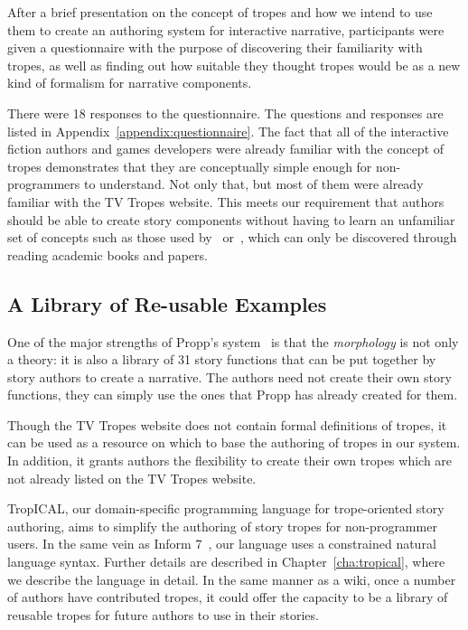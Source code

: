 \documentclass[11pt]{report}
\begin{document}
After a brief presentation on the concept of tropes and how we intend to use
them to create an authoring system for interactive narrative, participants were
given a questionnaire with the purpose of discovering their familiarity with
tropes, as well as finding out how suitable they thought tropes would be as a
new kind of formalism for narrative components.

There were 18 responses to the questionnaire. The questions and responses are
listed in Appendix~\ref{appendix:questionnaire}. The fact that all of the interactive fiction authors and games developers were
already familiar with the concept of tropes demonstrates that they are
conceptually simple enough for non-programmers to understand. Not only that, but
most of them were already familiar with the TV Tropes website. This meets our
requirement that authors should be able to create story components without
having to learn an unfamiliar set of concepts such as those used by~\citet{propp1968morphology}
or~\citet{lehnert1981plot}, which can only be discovered through reading
academic books and papers.

\subsection{A Library of Re-usable Examples}

One of the major strengths of Propp's system~\citep{propp1968morphology} is that
the \emph{morphology} is not only a theory: it is also a library of 31 story functions
that can be put together by story authors to create a narrative. The authors
need not create their own story functions, they can simply use the ones that
Propp has already created for them.

Though the TV Tropes website does not contain formal definitions of tropes, it
can be used as a resource on which to base the authoring of tropes in our system.
In addition, it grants authors the flexibility to create their own tropes which are not already listed on the
TV Tropes website.

TropICAL, our domain-specific programming language for trope-oriented story
authoring, aims to simplify the authoring of story tropes for non-programmer users.
In the same vein as Inform 7~\citep{reed2010creating}, our language uses a
constrained natural language syntax. Further details are described in
Chapter~\ref{cha:tropical}, where we describe the language in detail. In the same manner as a wiki, once a number of authors have contributed tropes,
it could offer the capacity to be a library of reusable tropes for future authors to use in
their stories.
\end{document}
